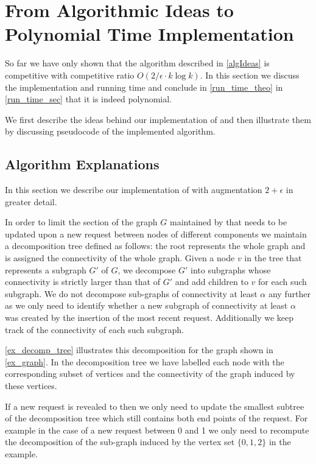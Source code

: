 \documentclass[a4paper, 10pt]{article}
\newcommand{\crep}{\text{C{\scriptsize REP}}}
\newcommand{\adjDel}{\text{C{\scriptsize REP}-A{\scriptsize DJ}}}
\theoremstyle{definition}
\begin{document}
\section{From Algorithmic Ideas to Polynomial Time Implementation}
\label{implDetSection}
So far we have only shown that the algorithm \adjDel{} described in \cref{algIdeas} is competitive with competitive ratio $O(2/\epsilon\cdot k \log k)$. In this section we discuss the implementation and running time and conclude in \cref{run_time_theo} in \cref{run_time_sec} that it is indeed polynomial.

We first describe the ideas behind our implementation of \crep{} and then illustrate them by discussing pseudocode of the implemented algorithm.

\subsection{Algorithm Explanations}

In this section we describe our implementation of \crep{} with augmentation $2+\epsilon$ in greater detail.

In order to limit the section of the graph $G$ maintained by \crep{} that needs to be updated upon a new request between nodes of different components we maintain a decomposition tree defined as follows: the root represents the whole graph and is assigned the connectivity of the whole graph. Given a node $v$ in the tree that represents a subgraph $G'$ of $G$, we decompose $G'$ into subgraphs whose connectivity is strictly larger than that of $G'$ and add children to $v$ for each such subgraph. We do not decompose sub-graphs of connectivity at least $\alpha$ any further as we only need to identify whether a new subgraph of connectivity at least $\alpha$ was created by the insertion of the most recent request.
Additionally we keep track of the connectivity of each such subgraph.

\cref{ex_decomp_tree} illustrates this decomposition for the graph shown in \cref{ex_graph}. In the decomposition tree we have labelled each node with the corresponding subset of vertices and the connectivity of the graph induced by these vertices.

If a new request is revealed to \crep{} then we only need to update the smallest subtree of the decomposition tree which still contains both end points of the request. For example in the case of a new request between 0 and 1 we only need to recompute the decomposition of the sub-graph induced by the vertex set $\{0,1,2\}$ in the example. 
\end{document}
